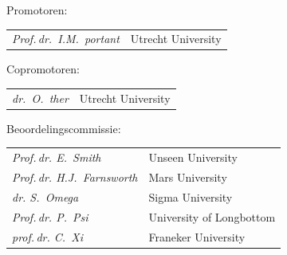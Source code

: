 \begin{titlepage}
\begin{center}
        \vspace*{2\bigskipamount}

\end{center}







\clearpage

\thispagestyle{empty}



Promotoren: \\[\medskipamount] 
\begin{tabular}{@{}p{}@{}p{}}     
        \textit{Prof.\,dr.\ I.M.~portant} &  Utrecht University \\[\medskipamount]     
\end{tabular}

Copromotoren: \\[\medskipamount] 
\begin{tabular}{@{}p{}@{}p{}} 
        \textit{dr.\ O.~ther} &  Utrecht University \\[\medskipamount]
\end{tabular}

\vspace*{2\bigskipamount}



Beoordelingscommissie: \\[\medskipamount] 
\begin{tabular}{@{}p{}@{}p{}}           
        \textit{Prof.\,dr. E.~Smith} &  Unseen University \\[\medskipamount]   
        \textit{Prof.\,dr. H.J.~Farnsworth} &  Mars University \\[\medskipamount]
        \textit{dr. S.~Omega} &  Sigma University \\[\medskipamount]
        \textit{Prof.\,dr. P.~Psi} & University of Longbottom \\[\medskipamount]
        \textit{prof.\,dr. C.~Xi} & Franeker University\\[\medskipamount]
\end{tabular}





\end{titlepage}
